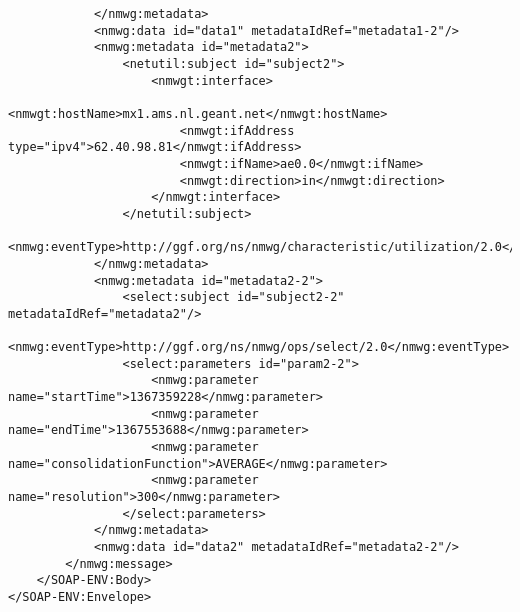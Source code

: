 \documentclass[a4paper,12pt,titlepage,hidelinks,fleqn]{article}
\begin{document}
\begin{flushleft}
\begin{framed}
\begin{lstlisting}
			</nmwg:metadata>
			<nmwg:data id="data1" metadataIdRef="metadata1-2"/>
			<nmwg:metadata id="metadata2">
				<netutil:subject id="subject2">
					<nmwgt:interface>
						<nmwgt:hostName>mx1.ams.nl.geant.net</nmwgt:hostName>
						<nmwgt:ifAddress type="ipv4">62.40.98.81</nmwgt:ifAddress>
						<nmwgt:ifName>ae0.0</nmwgt:ifName>
						<nmwgt:direction>in</nmwgt:direction>
					</nmwgt:interface>
				</netutil:subject>
				<nmwg:eventType>http://ggf.org/ns/nmwg/characteristic/utilization/2.0</nmwg:eventType>
			</nmwg:metadata>
			<nmwg:metadata id="metadata2-2">
				<select:subject id="subject2-2" metadataIdRef="metadata2"/>
				<nmwg:eventType>http://ggf.org/ns/nmwg/ops/select/2.0</nmwg:eventType>
				<select:parameters id="param2-2">
					<nmwg:parameter name="startTime">1367359228</nmwg:parameter>
					<nmwg:parameter name="endTime">1367553688</nmwg:parameter>
					<nmwg:parameter name="consolidationFunction">AVERAGE</nmwg:parameter>
					<nmwg:parameter name="resolution">300</nmwg:parameter>
				</select:parameters>
			</nmwg:metadata>
			<nmwg:data id="data2" metadataIdRef="metadata2-2"/>
		</nmwg:message>
	</SOAP-ENV:Body>
</SOAP-ENV:Envelope>
\end{lstlisting}
\end{framed}
\end{flushleft}
\end{document}
